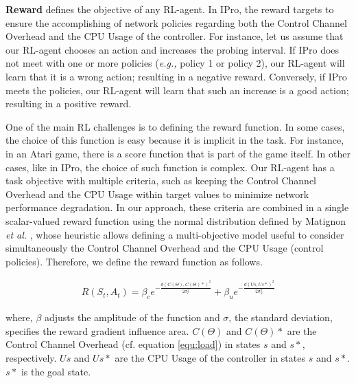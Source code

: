 \textbf{Reward} defines the objective of any RL-agent. In IPro, the reward targets to ensure the accomplishing of network policies regarding both the Control Channel Overhead and the CPU Usage of the controller. For instance, let us assume that our RL-agent chooses an action and increases the probing interval. If IPro does not meet with one or more policies (\textit{e.g.,} policy 1 or policy 2), our RL-agent will learn that it is a wrong action; resulting in a negative reward. Conversely, if IPro meets the policies, our RL-agent will learn that such an increase is a good action; resulting in a positive reward.

One of the main RL challenges is to defining the reward function. In some cases, the choice of this function is easy because it is implicit in the task. For instance,  in an Atari game, there is a score function that is part of the game itself. In other cases, like in IPro, the choice of such function is complex. Our RL-agent has a task objective with multiple criteria, such as keeping the Control Channel Overhead and the CPU Usage within target values to minimize network performance degradation. 
In our approach, these criteria are combined in a single scalar-valued reward function using the normal distribution defined by Matignon \textit{et al.} \cite{matignon_2006:improving}, whose heuristic allows defining a multi-objective model useful to consider simultaneously the Control Channel Overhead and the CPU Usage (control policies). Therefore, we define the reward function as follows.

\begin{equation}
    \begin{split}
       R\left ( S_t, A_t \right ) = \beta_c e^{-\frac{d\left ( C\left ( \Theta  \right ), C\left ( \Theta  \right )* \right )^2}{2\sigma_c^2 }} + \beta_u e^{-\frac{d\left ( Us,Us* \right )^2}{2\sigma_u^2 }}
    \end{split}
     \label{equ:reward}
\end{equation}

where, $\beta$ adjusts the amplitude of the function and $\sigma$, the standard deviation, specifies the reward gradient influence area. $C\left ( \Theta  \right ) $ and $C\left ( \Theta  \right )*$ are the Control Channel Overhead (cf. equation \ref{equ:load}) in states $s$ and $s*$, respectively. $Us$ and $Us*$ are the CPU Usage of the controller in states $s$ and $s*$. $s*$ is the goal state.

